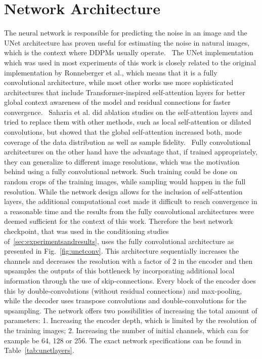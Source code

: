 \section{Network Architecture}
The neural network is responsible for predicting the noise in an image and the UNet architecture has proven useful for estimating the noise in natural images, which is the context where DDPMs usually operate.~\autocite{ronneberger2015unet,ho2020denoising} The UNet implementation which was used in most experiments of this work is closely related to the original implementation by Ronneberger et al., which means that it is a fully convolutional architecture, while most other works use more sophisticated architectures that include Transformer-inspired self-attention layers for better global context awareness of the model and residual connections for faster convergence.~\autocite{vaswani2017attention,he2015deep} Saharia et al. did ablation studies on the self-attention layers and tried to replace them with other methods, such as local self-attention or dilated convolutions, but showed that the global self-attention increased both, mode coverage of the data distribution as well as sample fidelity.~\autocite{saharia2022palette} Fully convolutional architectures on the other hand have the advantage that, if trained appropriately, they can generalize to different image resolutions, which was the motivation behind using a fully convolutional network. Such training could be done on random crops of the training images, while sampling would happen in the full resolution. While the network design allows for the inclusion of self-attention layers, the additional computational cost made it difficult to reach convergence in a reasonable time and the results from the fully convolutional architectures were deemed sufficient for the context of this work. Therefore the best network checkpoint, that was used in the conditioning studies of~\ref{sec:experimentsandresults}, uses the fully convolutional architecture as presented in Fig.~\ref{fig:unetconv}. This architecture sequentially increases the channels and decreases the resolution with a factor of 2 in the encoder and then upsamples the outputs of this bottleneck by incorporating additional local information through the use of skip-connections. Every block of the encoder does this by double-convolutions (without residual connections) and max-pooling, while the decoder uses transpose convolutions and double-convolutions for the upsampling. The network offers two possibilities of increasing the total amount of parameters: 1. Increasing the encoder depth, which is limited by the resolution of the training images; 2. Increasing the number of initial channels, which can for example be 64, 128 or 256. The exact network specifications can be found in Table~\ref{tab:unetlayers}.

